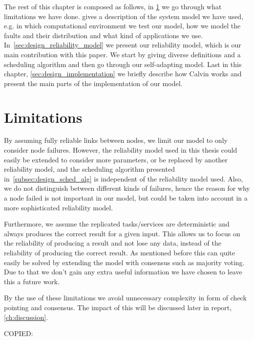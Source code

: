 \documentclass{cslthse-msc}
\begin{document}
The rest of this chapter is composed as follows, in \cref{sec:design_limitations} we go through what limitations we have done.  gives a description of the system model we have used, e.g. in which computational environment we test our model, how we model the faults and their distribution and what kind of applications we use. In~\cref{sec:design_reliability_model} we present our reliability model, which is our main contribution with this paper. We start by giving diverse definitions and a scheduling algorithm and then go through our self-adapting model. Last in this chapter, \cref{sec:design_implementation} we briefly describe how Calvin works and present the main parts of the implementation of our model.

\section{Limitations} \label{sec:design_limitations}
By assuming fully reliable links between nodes, we limit our model to only consider node failures. However, the reliability model used in this thesis could easily be extended to consider more parameters, or be replaced by another reliability model, and the scheduling algorithm presented in~\cref{subsec:design_sched_alg} is independent of the reliability model used. Also, we do not distinguish between different kinds of failures, hence the reason for why a node failed is not important in our model, but could be taken into account in a more sophisticated reliability model.

Furthermore, we assume the replicated tasks/services are deterministic and always produces the correct result for a given input. This allows us to focus on the reliability of producing a result and not lose any data, instead of the reliability of producing the correct result. As mentioned before this can quite easily be solved by extending the model with consensus such as majority voting. Due to that we don't gain any extra useful information we have chosen to leave this a future work.

By the use of these limitations we avoid unnecessary complexity in form of check pointing and consensus. The impact of this will be discussed later in report, \cref{ch:discussion}.

\iffalse
COPIED:
\end{document}
